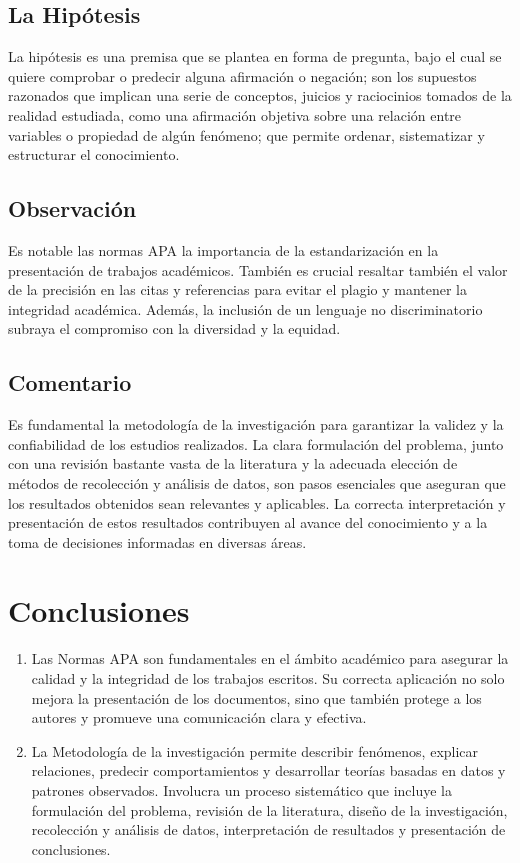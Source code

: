 \documentclass[12pt]{article}
\begin{document}
\subsection*{La Hipótesis}
La hipótesis es una premisa que se plantea en forma de pregunta, bajo el cual se quiere comprobar o predecir alguna afirmación o negación; son los supuestos razonados que implican una serie de conceptos, juicios y raciocinios tomados de la realidad estudiada, como una afirmación objetiva sobre una relación entre variables o propiedad de algún fenómeno; que permite ordenar, sistematizar y estructurar el conocimiento.

\subsection*{Observación}
Es notable las normas APA la importancia de la estandarización en la presentación de trabajos académicos. También es crucial resaltar también el valor de la precisión en las citas y referencias para evitar el plagio y mantener la integridad académica. Además, la inclusión de un lenguaje no discriminatorio subraya el compromiso con la diversidad y la equidad.

\subsection*{Comentario}
Es fundamental la metodología de la investigación para garantizar la validez y la confiabilidad de los estudios realizados. La clara formulación del problema, junto con una revisión bastante vasta de la literatura y la adecuada elección de métodos de recolección y análisis de datos, son pasos esenciales que aseguran que los resultados obtenidos sean relevantes y aplicables. La correcta interpretación y presentación de estos resultados contribuyen al avance del conocimiento y a la toma de decisiones informadas en diversas áreas.

\section*{Conclusiones}
\begin{enumerate}
    \item Las Normas APA son fundamentales en el ámbito académico para asegurar la calidad y la integridad de los trabajos escritos. Su correcta aplicación no solo mejora la presentación de los documentos, sino que también protege a los autores y promueve una comunicación clara y efectiva.
    \item La Metodología de la investigación permite describir fenómenos, explicar relaciones, predecir comportamientos y desarrollar teorías basadas en datos y patrones observados. Involucra un proceso sistemático que incluye la formulación del problema, revisión de la literatura, diseño de la investigación, recolección y análisis de datos, interpretación de resultados y presentación de conclusiones.
\end{enumerate}
\end{document}
